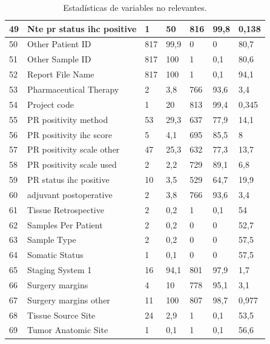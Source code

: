 \begin{table}[!htb]
\begin{threeparttable}
\begin{tabular}{p{0.5cm} p{4cm} p{1.5cm} p{2cm} p{1.5cm} p{2cm} p{1.5cm}}
		\\ \hline	49	&	Nte pr status ihc positive	&	1	&	50	&	816	&	99,8	&	0,138
		\\ \hline	50	&	Other Patient ID	&	817	&	99,9	&	0	&	0	&	80,7
		\\ \hline	51	&	Other Sample ID	&	817	&	100	&	1	&	0,1	&	80,6
		\\ \hline	52	&	Report File Name	&	817	&	100	&	1	&	0,1	&	94,1
		\\ \hline	53	&	Pharmaceutical Therapy 	&	2	&	3,8	&	766	&	93,6	&	3,4
		\\ \hline	54	&	Project code	&	1	&	20	&	813	&	99,4	&	0,345
		\\ \hline	55	&	PR positivity method	&	53	&	29,3	&	637	&	77,9	&	14,1
		\\ \hline	56	&	PR positivity ihc score	&	5	&	4,1	&	695	&	85,5	&	8
		\\ \hline	57	&	PR positivity scale other	&	47	&	25,3	&	632	&	77,3	&	13,7
		\\ \hline	58	&	PR positivity scale used	&	2	&	2,2	&	729	&	89,1	&	6,8
		\\ \hline	59	&	PR status ihc positive	&	10	&	3,5	&	529	&	64,7	&	19,9
		\\ \hline	60	&	adjuvant postoperative 	&	2	&	3,8	&	766	&	93,6	&	3,4
		\\ \hline	61	&	Tissue Retrospective 	&	2	&	0,2	&	1	&	0,1	&	54
		\\ \hline	62	&	Samples Per Patient	&	2	&	0,2	&	0	&	0	&	52,7
		\\ \hline	63	&	Sample Type	&	2	&	0,2	&	0	&	0	&	57,5
		\\ \hline	64	&	Somatic Status	&	1	&	0,1	&	0	&	0	&	57,5
		\\ \hline	65	&	Staging System 1	&	16	&	94,1	&	801	&	97,9	&	1,7
		\\ \hline	66	&	Surgery margins	&	4	&	10	&	778	&	95,1	&	3,1
		\\ \hline	67	&	Surgery margins other	&	11	&	100	&	807	&	98,7	&	0,977
		\\ \hline	68	&	Tissue Source Site	&	24	&	2,9	&	1	&	0,1	&	53,5
		\\ \hline	69	&	Tumor Anatomic Site	&	1	&	0,1	&	1	&	0,1	&	56,6
		\\ \hline
		\end{tabular}
		\caption{Estadísticas de variables no relevantes.}
		\label{data_no_relevante}
	\end{threeparttable}
\end{table}
\clearpage